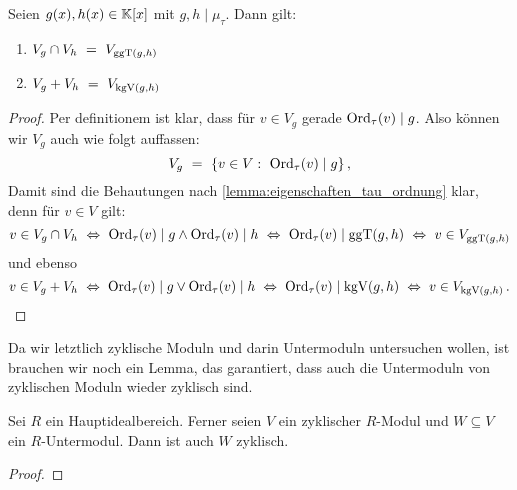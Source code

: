 \begin{lemma}
  \label{lemma:moduln:ueber_schnitt_und_vereinigung_von_v_g}
  Seien $g(x), h(x) \in \mathbb{K}[x]$ mit $g,h \mid \mu_\tau$. Dann gilt:
  \begin{enumerate}
    \item $V_g \cap V_h \ =\  V_{\operatorname{ggT}(g,h)}$
    \item $V_g + V_h \ =\  V_{\operatorname{kgV}(g,h)}$
  \end{enumerate}
\end{lemma}
\begin{proof}
  Per definitionem ist klar, dass für $v \in V_g$ gerade
  $\operatorname{Ord}_\tau(v) \mid g$. Also können wir $V_g$ auch wie folgt auffassen:
  \[ V_g \ =\  \{ v\in V:\ \operatorname{Ord}_\tau(v) \mid g\} \,,\]
  Damit sind die Behautungen nach \cref{lemma:eigenschaften_tau_ordnung} klar,
  denn für $v \in V$ gilt:
  \[ v\in V_g \cap V_h \ \Leftrightarrow\  
    \operatorname{Ord}_\tau(v) \mid g \land \operatorname{Ord}_\tau(v) \mid h \ \Leftrightarrow\ 
    \operatorname{Ord}_\tau(v) \mid \operatorname{ggT}(g,h) \ \Leftrightarrow\  v \in V_{\operatorname{ggT}(g,h)}\]
  und ebenso
  \[ v \in V_g + V_h \ \Leftrightarrow\  
    \operatorname{Ord}_\tau(v) \mid g \lor \operatorname{Ord}_\tau(v) \mid h \ \Leftrightarrow\ 
    \operatorname{Ord}_\tau(v) \mid \operatorname{kgV}(g,h) \ \Leftrightarrow\  v \in V_{\operatorname{kgV}(g,h)}\,.\]
\end{proof}

Da wir letztlich zyklische Moduln und darin Untermoduln untersuchen wollen, ist
brauchen wir noch ein Lemma, das garantiert, dass auch die Untermoduln von
zyklischen Moduln wieder zyklisch sind.

\begin{lemma}
  \label{lemma:untermoduln_bleiben_zyklisch}
  Sei $R$ ein Hauptidealbereich. Ferner seien $V$ ein zyklischer $R$-Modul und
  $W \subseteq V$ ein $R$-Untermodul. Dann ist auch $W$ zyklisch.
\end{lemma}
\begin{proof}
\TODO
{}
\end{proof}


